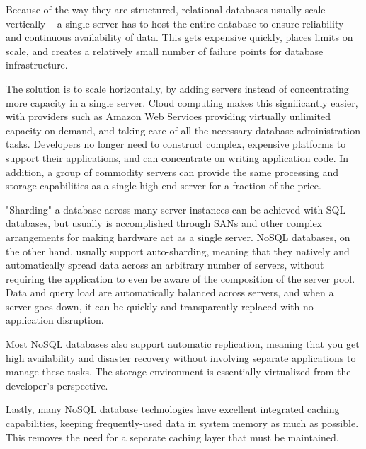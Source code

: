 \documentclass[12pt]{article}
\begin{document}
Because of the way they are structured, relational databases usually scale vertically – a single server has to host the entire database to ensure reliability and continuous availability of data. This gets expensive quickly, places limits on scale, and creates a relatively small number of failure points for database infrastructure.

The solution is to scale horizontally, by adding servers instead of concentrating more capacity in a single server. Cloud computing makes this significantly easier, with providers such as Amazon Web Services providing virtually unlimited capacity on demand, and taking care of all the necessary database administration tasks. Developers no longer need to construct complex, expensive platforms to support their applications, and can concentrate on writing application code. In addition, a group of commodity servers can provide the same processing and storage capabilities as a single high-end server for a fraction of the price.

"Sharding" a database across many server instances can be achieved with SQL databases, but usually is accomplished through SANs and other complex arrangements for making hardware act as a single server. NoSQL databases, on the other hand, usually support auto-sharding, meaning that they natively and automatically spread data across an arbitrary number of servers, without requiring the application to even be aware of the composition of the server pool. Data and query load are automatically balanced across servers, and when a server goes down, it can be quickly and transparently replaced with no application disruption.

Most NoSQL databases also support automatic replication, meaning that you get high availability and disaster recovery without involving separate applications to manage these tasks. The storage environment is essentially virtualized from the developer's perspective.

Lastly, many NoSQL database technologies have excellent integrated caching capabilities, keeping frequently-used data in system memory as much as possible. This removes the need for a separate caching layer that must be maintained.



\newpage
\end{document}
